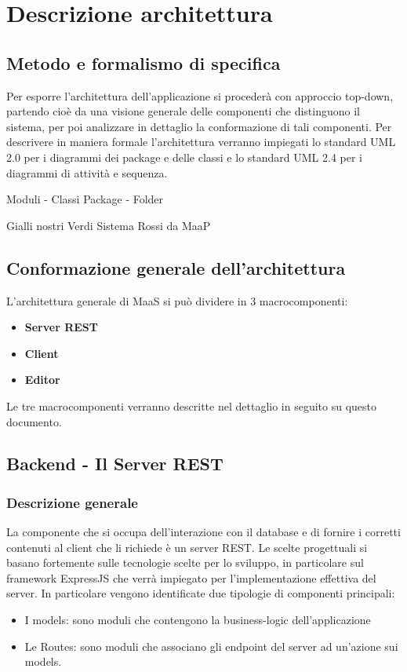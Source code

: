 \newpage
\section{Descrizione architettura}
\subsection{Metodo e formalismo di specifica}

Per esporre l'architettura dell'applicazione si procederà con approccio top-down, partendo cioè da una visione generale delle componenti che distinguono il sistema, per poi analizzare in dettaglio la conformazione di tali componenti.
Per descrivere in maniera formale l'architettura verranno impiegati lo standard UML 2.0 per i diagrammi dei package e delle classi e lo standard UML 2.4 per i diagrammi di attività e sequenza.

Moduli - Classi
Package - Folder

Gialli nostri
Verdi Sistema
Rossi da MaaP

\subsection{Conformazione generale dell'architettura}
L'architettura generale di MaaS si può dividere in 3 macrocomponenti:
\begin{itemize}
\item \textbf{Server REST} 
\item \textbf{Client} 
\item \textbf{Editor}
\end{itemize}
Le tre macrocomponenti verranno descritte nel dettaglio in seguito su questo documento.

\subsection{Backend - Il Server REST}
\subsubsection{Descrizione generale}
La componente che si occupa dell'interazione con il database e di fornire i corretti contenuti al client che li richiede è un server REST.
Le scelte progettuali si basano fortemente sulle tecnologie scelte per lo sviluppo, in particolare sul framework ExpressJS che verrà impiegato per l'implementazione effettiva del server. In particolare vengono identificate due tipologie di componenti principali:
\begin{itemize}
\item I models: sono moduli che contengono la business-logic dell'applicazione
\item Le Routes: sono moduli che associano gli endpoint del server ad un'azione sui models.
\end{itemize}

